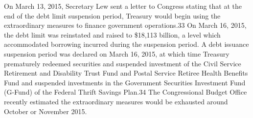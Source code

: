 \newline \newline
On March 13, 2015, Secretary Lew sent a letter to Congress stating that at the end of the debt limit suspension period, Treasury would begin using the extraordinary measures to finance government operations.33 On March 16, 2015, the debt limit was reinstated and raised to \$18,113 billion, a level which accommodated borrowing incurred during the suspension period. A debt issuance suspension period was declared on March 16, 2015, at which time Treasury prematurely redeemed securities and suspended investment of the Civil Service Retirement and Disability Trust Fund and Postal Service Retiree Health Benefits Fund and suspended investments in the Government Securities Investment Fund (G-Fund) of the Federal Thrift Savings Plan.34 The Congressional Budget Office recently estimated the extraordinary measures would be exhausted around October or November 2015.
